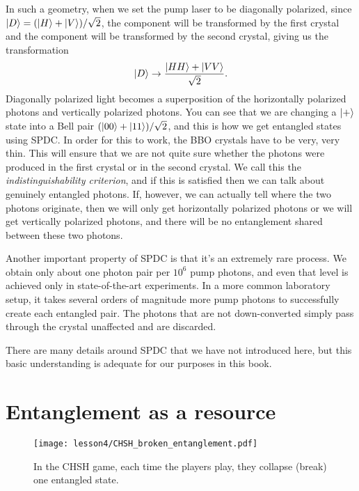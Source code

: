 In such a geometry, when we set the pump laser to be diagonally polarized, since $\left| D \right\rangle = (\left| H \right\rangle+\left| V \right\rangle)/\sqrt{2}$, the  component will be transformed by the first crystal and the  component will be transformed by the second crystal, giving us the  transformation
\begin{equation}
    \left| D \right\rangle \rightarrow \frac{\left| HH \right\rangle+\left| VV \right\rangle}{\sqrt{2}}.
\end{equation}
Diagonally polarized light becomes a superposition of the horizontally polarized photons and vertically polarized photons. You can see that we are changing a $\left| + \right\rangle$ state into a Bell pair $(\left| 00 \right\rangle+\left| 11 \right\rangle)/\sqrt{2}$, and this is how we get entangled states using SPDC.  In order for this to work, the BBO crystals have to be very, very thin. This will ensure that we are not quite sure whether the photons were produced in the first crystal or in the second crystal. We call this the \emph{indistinguishability criterion}, and if this is satisfied then we can talk about genuinely entangled photons. If, however, we can actually tell where the two photons originate, then we will only get horizontally polarized photons or we will get vertically polarized photons, and there will be no entanglement shared between these two photons. 

Another important property of SPDC is that it's an extremely rare process.  We obtain only about one photon pair per $10^6$ pump photons, and even that level is achieved only in state-of-the-art experiments. In a more common laboratory setup, it takes several orders of magnitude more pump photons to successfully create each entangled pair.  The photons that are not down-converted simply pass through the crystal unaffected and are discarded.

There are many details around SPDC that we have not introduced here, but this basic understanding is adequate for our purposes in this book.



\section{Entanglement as a resource}

\begin{figure}[H]
   \centering
    \texttt{[image: lesson4/CHSH\_broken\_entanglement.pdf]}
    
        \caption[CHSH game collapses entanglement.]{In the CHSH game, each time the players play, they collapse (break) one entangled state.}
    
    \label{fig:chsh-broken}
\end{figure}

